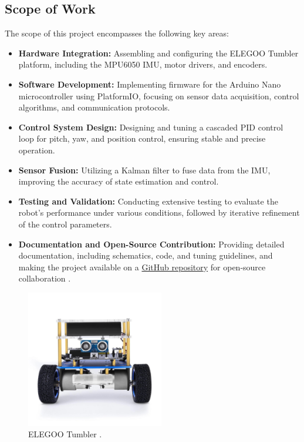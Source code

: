 \subsection{Scope of Work}
The scope of this project encompasses the following key areas:
\begin{itemize}
	\item \textbf{Hardware Integration:} Assembling and configuring the ELEGOO Tumbler platform, including the MPU6050 IMU, motor drivers, and encoders.
	\item \textbf{Software Development:} Implementing firmware for the Arduino Nano microcontroller using PlatformIO, focusing on sensor data acquisition, control algorithms, and communication protocols.
	\item \textbf{Control System Design:} Designing and tuning a cascaded PID control loop for pitch, yaw, and position control, ensuring stable and precise operation.
	\item \textbf{Sensor Fusion:} Utilizing a Kalman filter to fuse data from the IMU, improving the accuracy of state estimation and control.
	\item \textbf{Testing and Validation:} Conducting extensive testing to evaluate the robot's performance under various conditions, followed by iterative refinement of the control parameters.
	\item \textbf{Documentation and Open-Source Contribution:} Providing detailed documentation, including schematics, code, and tuning guidelines, and making the project available on a \href{https://github.com/haris-mujeeb/Self-Balancing-Robot}{GitHub repository} for open-source collaboration \cite{opensource}.
\end{itemize}

\begin{figure}[h]
	\centering
	\includegraphics[height=6cm]{assets/tumbller2.jpg}
	\caption{\label{fig:tumbler2} ELEGOO Tumbler \cite{tumbller}.}
\end{figure}